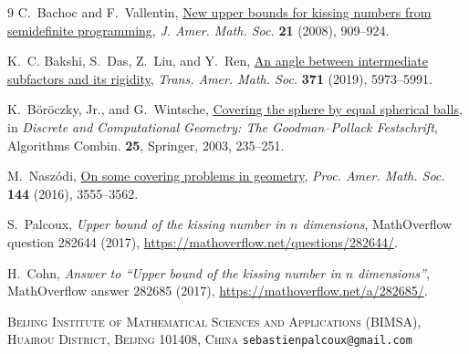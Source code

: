 \documentclass[11pt,a4paper]{article}
\theoremstyle{remark}
\begin{document}
\begingroup\small
\begin{thebibliography}{9}
C.~Bachoc and F.~Vallentin,
\href{https://doi.org/10.1090/S0894-0347-07-00589-9}{New upper bounds for kissing numbers from semidefinite programming},
\emph{J. Amer. Math. Soc.} \textbf{21} (2008), 909--924.

K.~C. Bakshi, S.~Das, Z.~Liu, and Y.~Ren,
\href{https://doi.org/10.1090/tran/7738}{An angle between intermediate subfactors and its rigidity},
\emph{Trans. Amer. Math. Soc.} \textbf{371} (2019), 5973--5991.

K.~B\"or\"oczky, Jr., and G.~Wintsche,
\href{https://doi.org/10.1007/978-3-642-55566-4_10}{Covering the sphere by equal spherical balls},
in \emph{Discrete and Computational Geometry: The Goodman--Pollack Festschrift},
Algorithms Combin. \textbf{25}, Springer, 2003, 235--251.

M.~Nasz\'odi,
\href{https://doi.org/10.1090/proc/12992}{On some covering problems in geometry},
\emph{Proc. Amer. Math. Soc.} \textbf{144} (2016), 3555--3562.

S.~Palcoux,
\emph{Upper bound of the kissing number in $n$ dimensions},
MathOverflow question 282644 (2017),
\url{https://mathoverflow.net/questions/282644/}.

H.~Cohn,
\emph{Answer to ``Upper bound of the kissing number in $n$ dimensions''},
MathOverflow answer 282685 (2017),
\url{https://mathoverflow.net/a/282685/}.
\end{thebibliography}
\endgroup

\vspace{0.5em}
\noindent
\textsc{Beijing Institute of Mathematical Sciences and Applications (BIMSA),}\newline
\textsc{Huairou District, Beijing 101408, China}\newline
\texttt{sebastienpalcoux@gmail.com}
\end{document}
